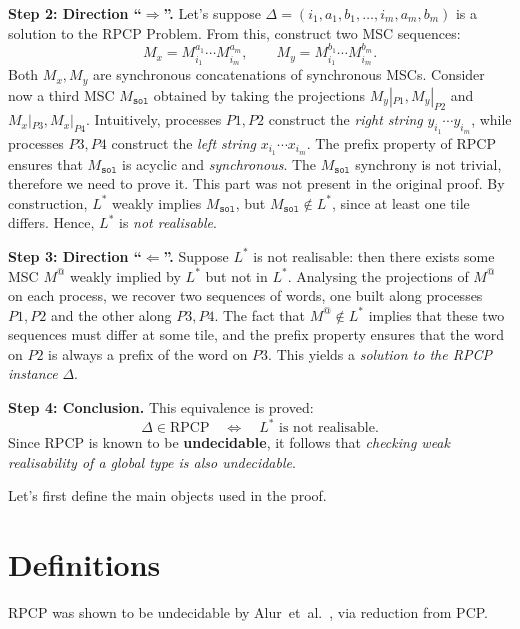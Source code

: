 \textbf{Step 2: Direction ``$\Rightarrow$''.}
Let's suppose $\Delta=(i_1,a_1,b_1,\ldots,i_m,a_m,b_m)$ is a solution
to the RPCP Problem.
From this, construct two MSC sequences:
\[
M_x = M^{a_1}_{i_1}\cdots M^{a_m}_{i_m}, \qquad
M_y = M^{b_1}_{i_1}\cdots M^{b_m}_{i_m}.
\]
Both $M_x,M_y$ are synchronous concatenations of synchronous MSCs.
Consider now a third MSC $M_{\texttt{sol}}$ obtained by taking the projections
$M_y|_{P1},M_y|_{P2}$ and $M_x|_{P3},M_x|_{P4}$. Intuitively, processes $P1,P2$
construct the \emph{right string} $y_{i_1}\cdots y_{i_m}$, while
processes $P3,P4$ construct the \emph{left string}
$x_{i_1}\cdots x_{i_m}$. The prefix property of RPCP ensures that
$M_{\texttt{sol}}$ is acyclic and \emph{synchronous}. 
The $M_{\texttt{sol}}$ synchrony is not trivial, therefore we need to prove it.
This part was not present in the original proof.
By construction, $L^*$ weakly
implies $M_{\texttt{sol}}$, but $M_{\texttt{sol}} \notin L^*$, since at least one tile
differs. Hence, $L^*$ is \emph{not realisable}.

\bigskip

\textbf{Step 3: Direction ``$\Leftarrow$''.}
Suppose $L^*$ is not realisable: then there exists some MSC $M^@$
weakly implied by $L^*$ but not in $L^*$. Analysing the projections
of $M^@$ on each process, we recover two sequences of words, one
built along processes $P1,P2$ and the other along $P3,P4$. The
fact that $M^@ \notin L^*$ implies that these two sequences must
differ at some tile, and the prefix property ensures that the word
on $P2$ is always a prefix of the word on $P3$. This yields a
\emph{solution to the RPCP instance} $\Delta$.

\bigskip

\textbf{Step 4: Conclusion.}
This equivalence is proved:
\[
\Delta \in \text{RPCP} \quad\iff\quad L^* \text{ is not realisable}.
\]
Since RPCP is known to be \textbf{undecidable}, it follows that
\emph{checking weak realisability of a global type is also
undecidable}.

\bigskip

Let's first define the main objects used in the proof.

\section{Definitions}
RPCP was shown to be 
undecidable by Alur~et~al.~\cite{alur2005realizability}, via reduction 
from PCP.

\bigskip

